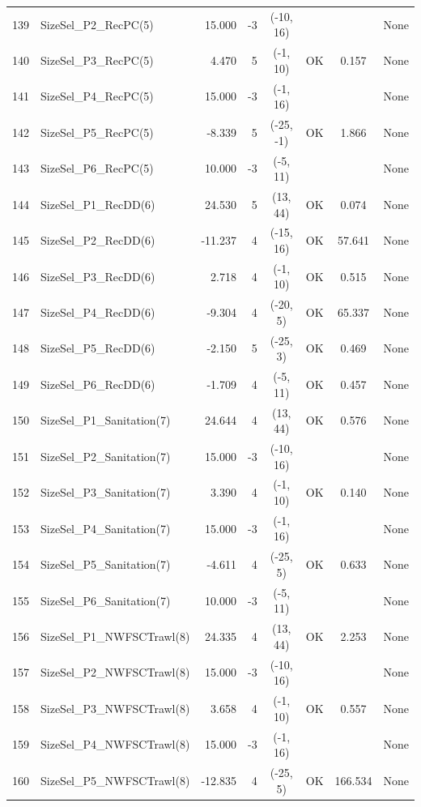 \documentclass[12pt,]{article}
\begin{document}
\begin{landscape}
\begin{longtable}{rlrrcccl}
  139 & SizeSel\_P2\_RecPC(5) & 15.000 & -3 & (-10, 16) &  &  & None \\ 
  140 & SizeSel\_P3\_RecPC(5) & 4.470 & 5 & (-1, 10) & OK & 0.157 & None \\ 
  141 & SizeSel\_P4\_RecPC(5) & 15.000 & -3 & (-1, 16) &  &  & None \\ 
  142 & SizeSel\_P5\_RecPC(5) & -8.339 & 5 & (-25, -1) & OK & 1.866 & None \\ 
  143 & SizeSel\_P6\_RecPC(5) & 10.000 & -3 & (-5, 11) &  &  & None \\ 
  144 & SizeSel\_P1\_RecDD(6) & 24.530 & 5 & (13, 44) & OK & 0.074 & None \\ 
  145 & SizeSel\_P2\_RecDD(6) & -11.237 & 4 & (-15, 16) & OK & 57.641 & None \\ 
  146 & SizeSel\_P3\_RecDD(6) & 2.718 & 4 & (-1, 10) & OK & 0.515 & None \\ 
  147 & SizeSel\_P4\_RecDD(6) & -9.304 & 4 & (-20, 5) & OK & 65.337 & None \\ 
  148 & SizeSel\_P5\_RecDD(6) & -2.150 & 5 & (-25, 3) & OK & 0.469 & None \\ 
  149 & SizeSel\_P6\_RecDD(6) & -1.709 & 4 & (-5, 11) & OK & 0.457 & None \\ 
  150 & SizeSel\_P1\_Sanitation(7) & 24.644 & 4 & (13, 44) & OK & 0.576 & None \\ 
  151 & SizeSel\_P2\_Sanitation(7) & 15.000 & -3 & (-10, 16) &  &  & None \\ 
  152 & SizeSel\_P3\_Sanitation(7) & 3.390 & 4 & (-1, 10) & OK & 0.140 & None \\ 
  153 & SizeSel\_P4\_Sanitation(7) & 15.000 & -3 & (-1, 16) &  &  & None \\ 
  154 & SizeSel\_P5\_Sanitation(7) & -4.611 & 4 & (-25, 5) & OK & 0.633 & None \\ 
  155 & SizeSel\_P6\_Sanitation(7) & 10.000 & -3 & (-5, 11) &  &  & None \\ 
  156 & SizeSel\_P1\_NWFSCTrawl(8) & 24.335 & 4 & (13, 44) & OK & 2.253 & None \\ 
  157 & SizeSel\_P2\_NWFSCTrawl(8) & 15.000 & -3 & (-10, 16) &  &  & None \\ 
  158 & SizeSel\_P3\_NWFSCTrawl(8) & 3.658 & 4 & (-1, 10) & OK & 0.557 & None \\ 
  159 & SizeSel\_P4\_NWFSCTrawl(8) & 15.000 & -3 & (-1, 16) &  &  & None \\ 
  160 & SizeSel\_P5\_NWFSCTrawl(8) & -12.835 & 4 & (-25, 5) & OK & 166.534 & None \\ 

\end{longtable}
\end{landscape}
\end{document}
